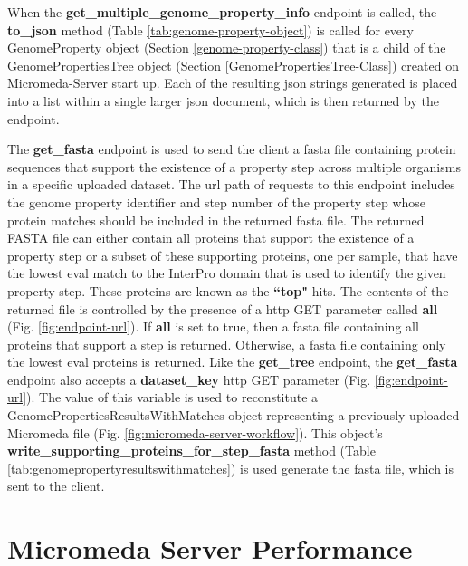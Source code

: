 When the \textbf{get\_multiple\_genome\_property\_info} endpoint is called, the 
\textbf{to\_json} method (Table \ref{tab:genome-property-object}) is called for 
every GenomeProperty object (Section \ref{genome-property-class}) that is a 
child of the GenomePropertiesTree object (Section 
\ref{GenomePropertiesTree-Class}) created on Micromeda-Server start up. Each of 
the resulting \gls{json} strings generated is placed into a list within a single larger 
\gls{json} document, which is then returned by the endpoint. 

The \textbf{get\_fasta} endpoint is used to send the client a \gls{fasta} file 
containing protein sequences that support the existence of a property step 
across multiple organisms in a specific uploaded dataset. The \gls{url} path of 
requests to this endpoint includes the genome property identifier and step 
number of the property step whose protein matches should be included in the 
returned \gls{fasta} file. The returned FASTA file can either contain all 
proteins that support the existence of a property step or a subset of these 
supporting proteins, one per sample, that have the lowest \gls{eval} match to 
the InterPro domain that is used to identify the given property step. These 
proteins are known as the \textbf{``top"} hits. The contents of the returned 
file is controlled by the presence of a \gls{http} GET parameter called 
\textbf{all} (Fig. \ref{fig:endpoint-url}). If \textbf{all} is set to true, then 
a \gls{fasta} file containing all proteins that support a step is returned. 
Otherwise, a \gls{fasta} file containing only the lowest \gls{eval} proteins is 
returned. Like the \textbf{get\_tree} endpoint, the \textbf{get\_fasta} endpoint 
also accepts a \textbf{dataset\_key} \gls{http} GET parameter (Fig. 
\ref{fig:endpoint-url}). The value of this variable is used to reconstitute a 
GenomePropertiesResultsWithMatches object representing a previously uploaded 
Micromeda file (Fig. \ref{fig:micromeda-server-workflow}). This object's 
\textbf{write\_supporting\_proteins\_for\_step\_fasta} method (Table 
\ref{tab:genomepropertyresultswithmatches}) is used generate the \gls{fasta} 
file, which is sent to the client.

\section{Micromeda Server Performance} \label{micromeda-server-performance}

